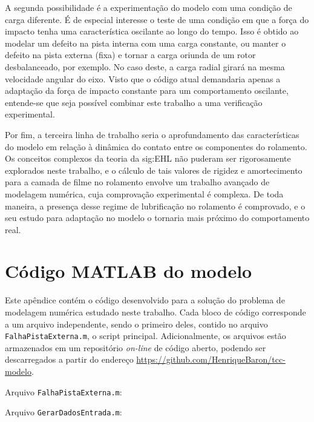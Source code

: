 \documentclass[12pt,oneside,english,brazil,lmodern,siglas,simbolos,cite=num]{ucsmonograph}
\begin{document}
	A segunda possibilidade é a experimentação do modelo com uma condição de carga diferente.
	É de especial interesse o teste de uma condição em que a força do impacto tenha uma característica oscilante ao longo do tempo.
	Isso é obtido ao modelar um defeito na pista interna com uma carga constante, ou manter o defeito na pista externa (fixa) e tornar a carga oriunda de um rotor desbalanceado, por exemplo.
	No caso deste, a carga radial girará na mesma velocidade angular do eixo.
	Visto que o código atual demandaria apenas a adaptação da força de impacto constante para um comportamento oscilante, entende-se que seja possível combinar este trabalho a uma verificação experimental.
	
	Por fim, a terceira linha de trabalho seria o aprofundamento das características do modelo em relação à dinâmica do contato entre os componentes do rolamento.
	Os conceitos complexos da teoria da \gls{sig:EHL} não puderam ser rigorosamente explorados neste trabalho, e o cálculo de tais valores de rigidez e amortecimento para a camada de filme no rolamento envolve um trabalho avançado de modelagem numérica, cuja comprovação experimental é complexa.
	De toda maneira, a presença desse regime de lubrificação no rolamento é comprovado, e o seu estudo para adaptação no modelo o tornaria mais próximo do comportamento real.
	
	\postextual
	
	
	
	\apendices
	\chapter{Código MATLAB\textsuperscript{\textregistered} do modelo} \label{apc:codigo}
	Este apêndice contém o código desenvolvido para a solução do problema de modelagem numérica estudado neste trabalho.
	Cada bloco de código corresponde a um arquivo independente, sendo o primeiro deles, contido no arquivo \texttt{FalhaPistaExterna.m}, o \foreignlanguage{english}{script} principal.
	Adicionalmente, os arquivos estão armazenados em um repositório \emph{on-line} de código aberto, podendo ser descarregados a partir do endereço \url{https://github.com/HenriqueBaron/tcc-modelo}.
	
	Arquivo \texttt{FalhaPistaExterna.m}:
	
	
	Arquivo \texttt{GerarDadosEntrada.m}:
	
	
\end{document}

